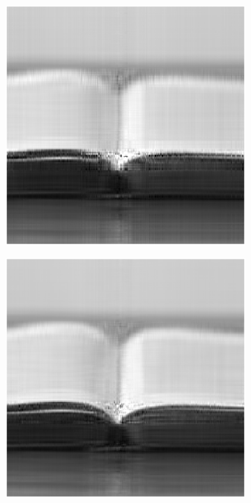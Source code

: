 \begin{figure}
    \begin{subfigure}{0.325\linewidth}
        \includegraphics[width=\linewidth]{Poglavja/Slike/kompleksnost/preprosta grayscale 300/rez35LMaFit.png}
    \end{subfigure}
    \hfill
    \begin{subfigure}{0.325\linewidth}
        \includegraphics[width=\linewidth]{Poglavja/Slike/kompleksnost/preprosta grayscale 300/rez45LMaFit.png}

\end{subfigure}
\end{figure}
